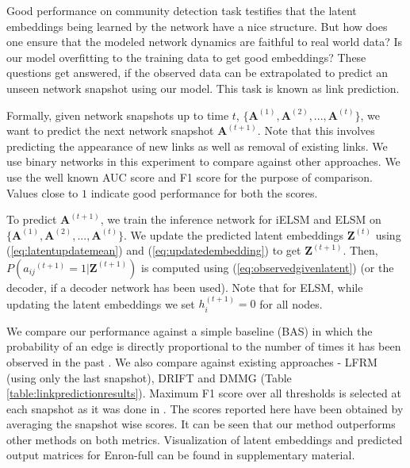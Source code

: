 \documentclass[letterpaper]{article}
\begin{document}
Good performance on community detection task testifies that the latent embeddings being learned by the network have a nice structure. But how does one ensure that the modeled network dynamics are faithful to real world data? Is our model overfitting to the training data to get good embeddings? These questions get answered, if the observed data can be extrapolated to predict an unseen network snapshot using our model. This task is known as link prediction.

Formally, given network snapshots up to time ${t}$, $\{\mathbf{A}^{(1)}, \mathbf{A}^{(2)}, ..., \mathbf{A}^{(t)}\}$, we want to predict the next network snapshot $\mathbf{A}^{(t+1)}$. Note that this involves predicting the appearance of new links as well as removal of existing links. We use binary networks in this experiment to compare against other approaches. We use the well known AUC score and F1 score for the purpose of  comparison. Values close to $1$ indicate good performance for both the scores.

To predict $\mathbf{A}^{(t+1)}$, we train the inference network for iELSM and ELSM on $\{\mathbf{A}^{(1)}, \mathbf{A}^{(2)}, ..., \mathbf{A}^{(t)}\}$. We update the predicted latent embeddings $\mathbf{Z}^{(t)}$ using (\ref{eq:latentupdatemean}) and (\ref{eq:updatedembedding}) to get  $\mathbf{Z}^{(t + 1)}$. Then, $P({a_{ij}}^{(t+1)} = 1 | \mathbf{Z}^{(t + 1)})$ is computed using (\ref{eq:observedgivenlatent}) (or the decoder, if a decoder network has been used). Note that for ELSM, while updating the latent embeddings we set $h_i^{(t+1)} = 0$ for all nodes.

We compare our performance against a simple baseline (BAS) in which the probability of an edge is directly proportional to the number of times it has been observed in the past \cite{FouldsEtAl:2011:ADynamicRelationalInfiniteFeatureModelForLongitudinalSocialNetworks}. We also compare against existing approaches - LFRM \cite{MillerEtAl:2009:NonparametricLatentFeatureModelsForLinkPrediction} (using only the last snapshot), DRIFT \cite{FouldsEtAl:2011:ADynamicRelationalInfiniteFeatureModelForLongitudinalSocialNetworks} and DMMG \cite{KimEtAl:2013:NonparametricMultiGroupMembershipModelForDynamicNetworks} (Table \ref{table:linkpredictionresults}). Maximum F1 score over all thresholds is selected at each snapshot as it was done in \cite{KimEtAl:2013:NonparametricMultiGroupMembershipModelForDynamicNetworks}. The scores reported here have been obtained by averaging the snapshot wise scores. It can be seen that our method outperforms other methods on both metrics. Visualization of latent embeddings and predicted output matrices for Enron-full can be found in supplementary material.
\end{document}
